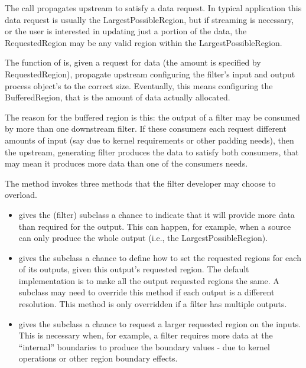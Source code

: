 The  call propagates upstream to
satisfy a data request. In typical application this data request is usually the
LargestPossibleRegion, but if streaming is necessary, or the user is
interested in updating just a portion of the data, the RequestedRegion may be
any valid region within the LargestPossibleRegion.

The function of  is, given a request
for data (the amount is specified by RequestedRegion), propagate
upstream configuring the filter's input and output process object's to
the correct size. Eventually, this means configuring the
BufferedRegion, that is the amount of data actually allocated.

The reason for the buffered region is this: the output of a filter may be
consumed by more than one downstream filter. If these consumers each request
different amounts of input (say due to kernel requirements or other padding
needs), then the upstream, generating filter produces the data to satisfy
both consumers, that may mean it produces more data than one of the
consumers needs.

The  method invokes
three methods that the filter developer may choose to overload.

\begin{itemize}
        \item {} gives the
        (filter) subclass a chance to indicate that it will provide more data
        than required for the output. This can happen, for example, when a
        source can only produce the whole output (i.e., the
        LargestPossibleRegion).

        \item {} gives
        the subclass a chance to define how to set the requested regions for
        each of its outputs, given this output's requested region.  The default
        implementation is to make all the output requested regions the same.
        A subclass may need to override this method if each output is a
        different resolution. This method is only overridden if a filter has
        multiple outputs.

        \item {} gives the subclass a
        chance to
        request a larger requested region on the inputs. This is necessary
        when, for example, a filter requires more data at the ``internal''
        boundaries to produce the boundary values - due to kernel operations
        or other region boundary effects.
\end{itemize}

